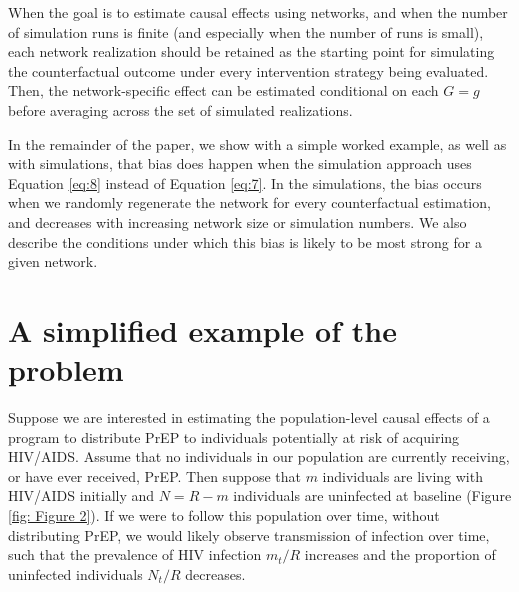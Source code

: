 \documentclass{article}
\theoremstyle{definition}
\begin{document}
When the goal is to estimate causal effects using networks, and when the number of simulation runs is finite (and especially when the number of runs is small), each network realization should be retained as the starting point for simulating the counterfactual outcome under every intervention strategy being evaluated. Then, the network-specific effect can be estimated conditional on each $G=g$ before averaging across the set of simulated realizations. 

In the remainder of the paper, we show with a simple worked example, as well as with simulations, that bias does happen when the simulation approach uses Equation \ref{eq:8} instead of Equation \ref{eq:7}. In the simulations, the bias occurs when we randomly regenerate the network for every counterfactual estimation, and decreases with increasing network size or simulation numbers. We also describe the conditions under which this bias is likely to be most strong for a given network.

\section{A simplified example of the problem}
Suppose we are interested in estimating the population-level causal effects of a program to distribute PrEP to individuals potentially at risk of acquiring HIV/AIDS. Assume that no individuals in our population are currently receiving, or have ever received, PrEP. Then suppose that $m$ individuals are living with HIV/AIDS initially and $N = R-m$ individuals are uninfected at baseline (Figure \ref{fig: Figure 2}). If we were to follow this population over time, without distributing PrEP, we would likely observe transmission of infection over time, such that the prevalence of HIV infection $m_t/R$ increases and the proportion of uninfected individuals $N_t/R$ decreases. 
\end{document}
